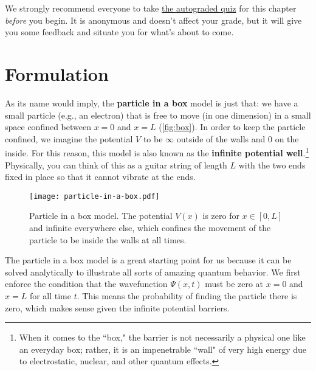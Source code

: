 \begin{tcolorbox}[colframe=PaloAlto, colbacktitle=PaloAlto!20!white, title=Self-check quiz]
	We strongly recommend everyone to take \href{https://forms.gle/PEXy8ttaf9p9hmN58}{the autograded quiz} for this chapter \emph{before} you begin.
	It is anonymous and doesn't affect your grade, but it will give you some feedback and situate you for what's about to come.
\end{tcolorbox}


\section{Formulation}

As its name would imply, the \textbf{particle in a box} model is just that: we have a small particle (e.g., an electron) that is free to move (in one dimension) in a small space confined between $x = 0$ and $x = L$ (\autoref{fig:box}). 
In order to keep the particle confined, we imagine the potential $V$ to be $\infty$ outside of the walls and 0 on the inside. 
For this reason, this model is also known as the \textbf{infinite potential well}.\footnote{When it comes to the ``box," the barrier is not necessarily a physical one like an everyday box; rather, it is an impenetrable ``wall" of very high energy due to electrostatic, nuclear, and other quantum effects.}
Physically, you can think of this as a guitar string of length $L$ with the two ends fixed in place so that it cannot vibrate at the ends.

\begin{figure}[!h]
	\centering
	\texttt{[image: particle-in-a-box.pdf]}
	\caption{Particle in a box model. 
		The potential $V(x)$ is zero for $x \in [0,L]$ and infinite everywhere else, which confines the movement of the particle to be inside the walls at all times.}
	\label{fig:box}
\end{figure}

The particle in a box model is a great starting point for us because it can be solved analytically to illustrate all sorts of amazing quantum behavior. 
We first enforce the condition that the wavefunction $\Psi(x,t)$ must be zero at $x = 0$ and $x = L$ for all time $t$. 
This means the probability of finding the particle there is zero, which makes sense given the infinite potential barriers.

